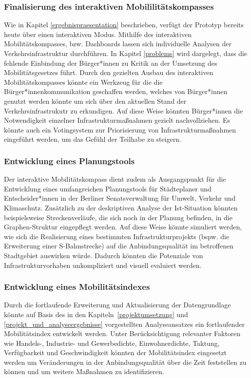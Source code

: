 \subsubsection{Finalisierung des interaktiven Mobililitätskompasses}
Wie in Kapitel \ref{ergebnispraesentation} beschrieben, verfügt der Prototyp bereits heute über einen interaktiven Modus. Mithilfe des interaktiven Mobilitätskompasses, bzw. Dashboards lassen sich individuelle Analysen der Verkehrsinfrastruktur durchführen. In Kapitel \ref{problems} wird dargelegt, dass die fehlende Einbindung der Bürger*innen zu Kritik an der Umsetzung des Mobilitätsgesetzes führt. Durch den gezielten Ausbau des interaktiven Mobilitätskompasses könnte ein Werkzeug für die die Bürger*innenkommunikation geschaffen werden, welches von Bürger*innen genutzt werden könnte um sich über den aktuellen Stand der Verkehrsinfrastrukutr zu erkundigen. Auf diese Weise könnten Bürger*innen die Notwendigkeit einzelner Infrastrukturmaßnahmen gezielt nachvollziehen. Es könnte auch ein Votingsystem zur Priorisierung von Infrastrukturmaßnahmen eingeführt werden, um das Gefühl der Teilhabe zu steigern.



\subsubsection{Entwicklung eines Planungstools}
Der interaktive Mobilitätskompass dient zudem als Ausgangspunkt für die Entwicklung eines umfangreichen Planungstools für Städteplaner und Entscheider*innen in der Berliner Senatsverwaltung für Umwelt, Verkehr und Klimaschutz. Zusätzlich zu der deskriptiven Analyse der Ist-Situation könnten beispielsweise Streckenverläufe, die sich noch in der Planung befinden, in die Graphen-Struktur eingepflegt werden. Auf diese Weise könnte simuliert werden, wie sich die Realisierung eines bestimmten Infrastrukturprojekts (bspw. die Erweiterung einer S-Bahnstrecke) auf die Anbindungsqualität im betroffenen Stadtgebiet auswirken würde. Dadurch könnten die Potenziale von Infrastrukturvorhaben unkompliziert und visuell evaluiert werden.

\subsubsection{Entwicklung eines Mobilitätsindexes}\label{mobwob_index}
Durch die fortlaufende Erweiterung und Aktualisierung der Datengrundlage könnte auf Basis des in den Kapiteln~\ref{projektumsetzung} und \ref{projekt_und_analyseergebnisse} vorgestellten Analyseansatzes ein fortlaufender Mobilitätsindex entwickelt werden. Unter Berücksichtigung relevanter Faktoren wie Handels-, Industrie- und Gewerbedichte, Einwohnerdichte, Taktung, Verfügbarkeit und Geschwindigkeit könnten der Mobilitätsindex eingesetzt werden um Veränderungen in der Anbindungsqualität über die Zeit feststellen zu können und um weitere Maßnahmen zu identifizieren. 

